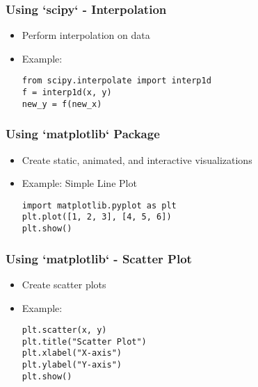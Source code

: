 \documentclass{beamer}
\begin{document}
\begin{frame}
    \frametitle{Using `scipy` - Interpolation}
    \begin{itemize}
        \item Perform interpolation on data
        \item Example:
        \begin{tcolorbox}[colback=lightblue, colframe=darkblue, title=Interpolation]
            \lstinline|from scipy.interpolate import interp1d| \\
            \lstinline|f = interp1d(x, y)| \\
            \lstinline|new_y = f(new_x)| 
        \end{tcolorbox}
    \end{itemize}
\end{frame}

\begin{frame}
    \frametitle{Using `matplotlib` Package}
    \begin{itemize}
        \item Create static, animated, and interactive visualizations
        \item Example: Simple Line Plot
        \begin{tcolorbox}[colback=lightblue, colframe=darkblue, title=Line Plot]
            \lstinline|import matplotlib.pyplot as plt| \\
            \lstinline|plt.plot([1, 2, 3], [4, 5, 6])| \\
            \lstinline|plt.show()|
        \end{tcolorbox}
    \end{itemize}
\end{frame}

\begin{frame}
    \frametitle{Using `matplotlib` - Scatter Plot}
    \begin{itemize}
        \item Create scatter plots
        \item Example:
        \begin{tcolorbox}[colback=lightblue, colframe=darkblue, title=Scatter Plot]
            \lstinline|plt.scatter(x, y)| \\
            \lstinline|plt.title("Scatter Plot")| \\
            \lstinline|plt.xlabel("X-axis")| \\
            \lstinline|plt.ylabel("Y-axis")| \\
            \lstinline|plt.show()|
        \end{tcolorbox}
    \end{itemize}
\end{frame}
\end{document}
